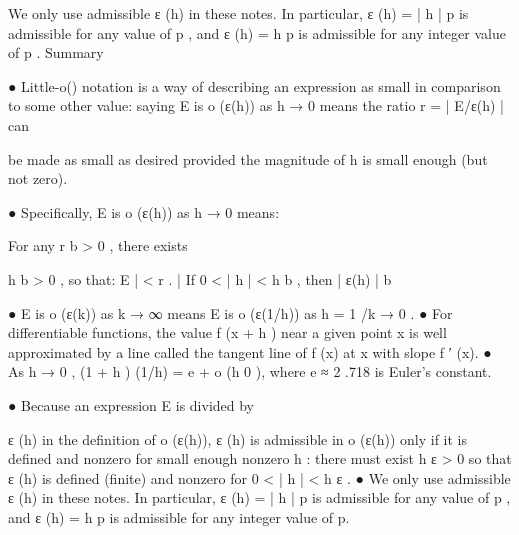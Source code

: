  We only use admissible   ε (h)  in these notes.  In particular,  ε (h) = | h | p  is admissible for  
any value of  p ,  and   ε (h) = h p  is admissible for any integer value of  p .  
Summary
 
●
Little-o() notation is a way of describing an expression as small in comparison to 
some other value: saying  E  is 
  o (ε(h))  as  h → 0  means the ratio  r = | E/ε(h) |  can
 
 be made as small as desired provided the magnitude of  h is small enough (but  
not zero). 
 
●
Specifically,  E    is  o (ε(h))  as  h → 0  means:  
 
For any  r b > 0 ,  there exists 
 
h b > 0 ,  so that:   
E | < r .  
|
 If  0 < | h | < h b ,  then  | ε(h)
| b
 
● E  is 
  o (ε(k))    as  k → ∞   means  E is 
  o (ε(1/h))  as  h = 1 /k → 0 .  
● For differentiable functions, the value  f (x + h )  near a given point  x is well  
approximated by a line called the tangent line of  f (x)  at  x with slope  f ′ (x).    
● As  h → 0 ,   (1 + h ) (1/h) = e + o (h 0 ),  where  e ≈ 2 .718  is Euler’s constant.
 
 
● Because an expression  E  is divided by 
 
ε (h) in the definition of  o (ε(h)),   ε (h)  is  
admissible in  o (ε(h))  only if it is defined and nonzero for small enough nonzero  
h :  there must exist  h ε > 0  so that  ε (h)  is defined (finite) and nonzero for  
0 < | h | < h ε .     
●  We only use admissible   ε (h)  in these notes.  In particular,  ε (h) = | h | p  is  
admissible for any value of  p ,  and   ε (h) = h p  is admissible for any integer value of  
p.
